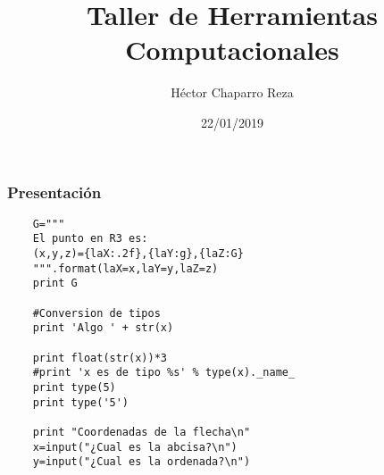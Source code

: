 \documentclass{beamer}
\title{Taller de Herramientas Computacionales}
\author{Héctor Chaparro Reza}
\date{22/01/2019}
\begin{document}
	\begin{frame}
	\frametitle{Presentación}
\end{frame}

\begin{frame}[fragile]
	\begin{verbatim}
	G="""
	El punto en R3 es:
	(x,y,z)={laX:.2f},{laY:g},{laZ:G} 
	""".format(laX=x,laY=y,laZ=z)
	print G
	
	#Conversion de tipos
	print 'Algo ' + str(x)
	
	print float(str(x))*3
	#print 'x es de tipo %s' % type(x)._name_
	print type(5)
	print type('5')
	
	print "Coordenadas de la flecha\n"
	x=input("¿Cual es la abcisa?\n")
	y=input("¿Cual es la ordenada?\n")	
	\end{verbatim}
\end{frame}
	
\end{document}
